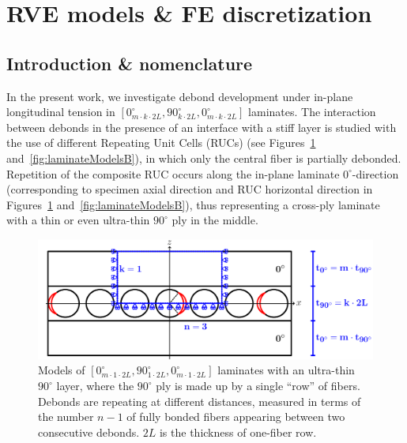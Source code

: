 \documentclass[Review,sagev,times]{sagej}
\begin{document}
\section{RVE models \& FE discretization}


\subsection{Introduction \& nomenclature}\label{subsec:names}

In the present work, we investigate debond development under in-plane longitudinal tension in $\left[0_{m\cdot k\cdot2L}^{\circ},90_{k\cdot2L}^{\circ},0_{m\cdot k\cdot2L}^{\circ}\right]$ laminates. The interaction between debonds in the presence of an interface with a stiff layer is studied with the use of different Repeating Unit Cells (RUCs)  (see Figures~\ref{fig:laminateModelsA} and~\ref{fig:laminateModelsB}), in which only the central fiber is partially debonded. Repetition of the composite RUC occurs along the in-plane laminate $0^{\circ}$-direction (corresponding to specimen axial direction and RUC horizontal direction in Figures~\ref{fig:laminateModelsA} and~\ref{fig:laminateModelsB}), thus representing a cross-ply laminate with a thin or even ultra-thin $90^{\circ}$ ply in the middle.\\

\begin{figure}[!htb]
\centering
  \includegraphics[height=0.225\textheight]{thinPly.pdf}
\caption{Models of $\left[0_{m\cdot 1\cdot2L}^{\circ},90_{1\cdot2L}^{\circ},0_{m\cdot 1\cdot2L}^{\circ}\right]$ laminates with an ultra-thin $90^{\circ}$ layer, where the $90^{\circ}$ ply is made up by a single ``row'' of fibers. Debonds are repeating at different distances, measured in terms of the number $n-1$ of fully bonded fibers appearing between two consecutive debonds. $2L$ is the thickness of one-fiber row.}\label{fig:laminateModelsA}
\end{figure}
\end{document}
